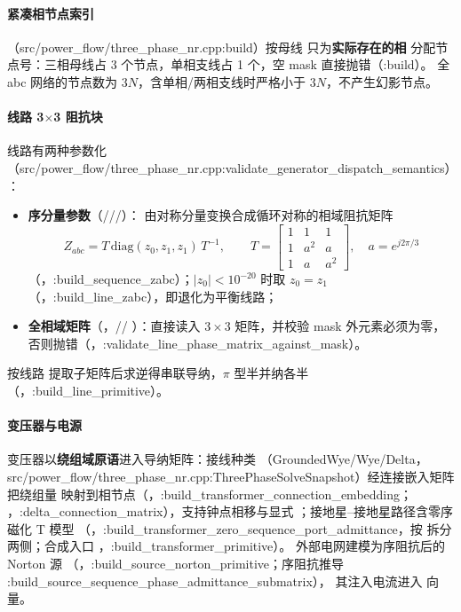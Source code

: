 \paragraph{紧凑相节点索引} 
（src/power\_flow/three\_phase\_nr.cpp:build）按母线  只为\textbf{实际存在的相}
分配节点号：三相母线占 3 个节点，单相支线占 1 个，空 mask 直接抛错（:build）。
全 abc 网络的节点数为 $3N$，含单相/两相支线时严格小于 $3N$，不产生幻影节点。

\paragraph{线路 3$\times$3 阻抗块} 线路有两种参数化
（src/power\_flow/three\_phase\_nr.cpp:validate\_generator\_dispatch\_semantics）：
\begin{itemize}
  \item \textbf{序分量参数}（///）：
        由对称分量变换合成循环对称的相域阻抗矩阵
        \[
        Z_{abc}=T\,\mathrm{diag}(z_0,z_1,z_1)\,T^{-1},\qquad
        T=\begin{bmatrix}1&1&1\\1&a^2&a\\1&a&a^2\end{bmatrix},\quad a=e^{j2\pi/3}
        \]
        （，:build\_sequence\_zabc）；$|z_0|<10^{-20}$ 时取 $z_0=z_1$
        （，:build\_line\_zabc），即退化为平衡线路；
  \item \textbf{全相域矩阵}（，//%
        ）：直接读入 $3\times3$ 矩阵，并校验 mask 外元素必须为零，
        否则抛错（，:validate\_line\_phase\_matrix\_against\_mask）。
\end{itemize}
按线路  提取子矩阵后求逆得串联导纳，$\pi$ 型半并纳各半
（，:build\_line\_primitive）。

\paragraph{变压器与电源} 变压器以\textbf{绕组域原语}进入导纳矩阵：接线种类
（GroundedWye/Wye/Delta，src/power\_flow/three\_phase\_nr.cpp:ThreePhaseSolveSnapshot）经连接嵌入矩阵把绕组量
映射到相节点（，:build\_transformer\_connection\_embedding；
，:delta\_connection\_matrix），支持钟点相移与显式
；接地星--接地星路径含零序磁化 T 模型
（，:build\_transformer\_zero\_sequence\_port\_admittance，按
 拆分两侧；合成入口 ，:build\_transformer\_primitive）。
外部电网建模为序阻抗后的 Norton 源
（，:build\_source\_norton\_primitive；序阻抗推导 :build\_source\_sequence\_phase\_admittance\_submatrix），
其注入电流进入  向量。

